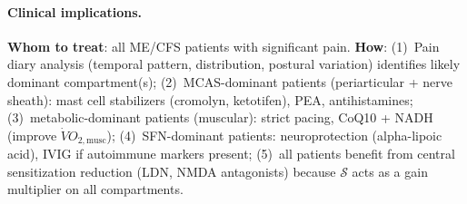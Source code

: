 \paragraph{Clinical implications.}
\textbf{Whom to treat}: all ME/CFS patients with significant pain. \textbf{How}: (1)~Pain diary analysis (temporal pattern, distribution, postural variation) identifies likely dominant compartment(s); (2)~MCAS-dominant patients (periarticular + nerve sheath): mast cell stabilizers (cromolyn, ketotifen), PEA, antihistamines; (3)~metabolic-dominant patients (muscular): strict pacing, CoQ10 + NADH (improve $\dot{V}O_{2,\text{musc}}$); (4)~SFN-dominant patients: neuroprotection (alpha-lipoic acid), IVIG if autoimmune markers present; (5)~all patients benefit from central sensitization reduction (LDN, NMDA antagonists) because $\mathcal{S}$ acts as a gain multiplier on all compartments.
